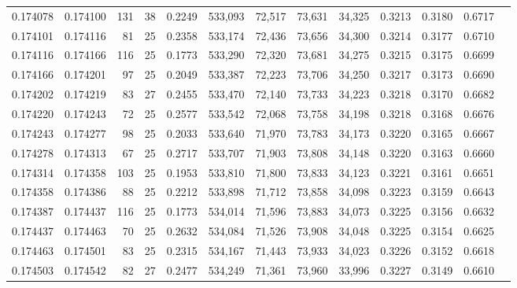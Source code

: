 \begin{tabular}{rrrrrrrrrrrrr}
0.174078 & 0.174100 & 131 &  38 &                                     0.2249 & 533,093 &  72,517 &  73,631 &  34,325 & 0.3213 & 0.3180 & 0.6717 \\
0.174101 & 0.174116 &  81 &  25 &                                     0.2358 & 533,174 &  72,436 &  73,656 &  34,300 & 0.3214 & 0.3177 & 0.6710 \\
0.174116 & 0.174166 & 116 &  25 &                                     0.1773 & 533,290 &  72,320 &  73,681 &  34,275 & 0.3215 & 0.3175 & 0.6699 \\
0.174166 & 0.174201 &  97 &  25 &                                     0.2049 & 533,387 &  72,223 &  73,706 &  34,250 & 0.3217 & 0.3173 & 0.6690 \\
0.174202 & 0.174219 &  83 &  27 &                                     0.2455 & 533,470 &  72,140 &  73,733 &  34,223 & 0.3218 & 0.3170 & 0.6682 \\
0.174220 & 0.174243 &  72 &  25 &                                     0.2577 & 533,542 &  72,068 &  73,758 &  34,198 & 0.3218 & 0.3168 & 0.6676 \\
0.174243 & 0.174277 &  98 &  25 &                                     0.2033 & 533,640 &  71,970 &  73,783 &  34,173 & 0.3220 & 0.3165 & 0.6667 \\
0.174278 & 0.174313 &  67 &  25 &                                     0.2717 & 533,707 &  71,903 &  73,808 &  34,148 & 0.3220 & 0.3163 & 0.6660 \\
0.174314 & 0.174358 & 103 &  25 &                                     0.1953 & 533,810 &  71,800 &  73,833 &  34,123 & 0.3221 & 0.3161 & 0.6651 \\
0.174358 & 0.174386 &  88 &  25 &                                     0.2212 & 533,898 &  71,712 &  73,858 &  34,098 & 0.3223 & 0.3159 & 0.6643 \\
0.174387 & 0.174437 & 116 &  25 &                                     0.1773 & 534,014 &  71,596 &  73,883 &  34,073 & 0.3225 & 0.3156 & 0.6632 \\
0.174437 & 0.174463 &  70 &  25 &                                     0.2632 & 534,084 &  71,526 &  73,908 &  34,048 & 0.3225 & 0.3154 & 0.6625 \\
0.174463 & 0.174501 &  83 &  25 &                                     0.2315 & 534,167 &  71,443 &  73,933 &  34,023 & 0.3226 & 0.3152 & 0.6618 \\
0.174503 & 0.174542 &  82 &  27 &                                     0.2477 & 534,249 &  71,361 &  73,960 &  33,996 & 0.3227 & 0.3149 & 0.6610 \\

\end{tabular}
